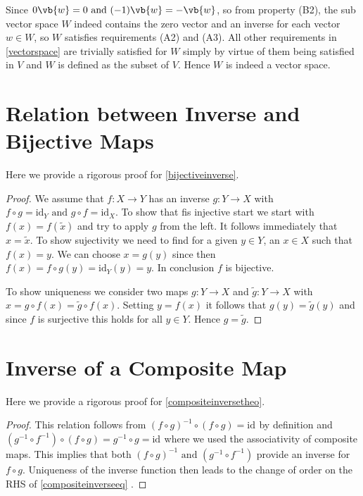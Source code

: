 \documentclass[a4paper,12pt]{report}
\begin{document}
\begin{appendices}
Since \(0\vb{w} =0 \text { and } (-1)\vb{w} =-\vb{w} \), so from property (B2), the sub vector space \(W\) indeed contains the zero vector and an inverse for each vector \(w \in  W\), so \(W\) satisfies requirements (A2) and (A3). All other requirements in \cref{vectorspace} are trivially satisfied for \(W\) simply by virtue of them being satisfied in \(V\) and \(W\) is defined as the subset of \(V\). Hence \(W\) is indeed a vector space.    

\section{Relation between Inverse and Bijective Maps} \label{bijectiveinverseapp} 

Here we provide a rigorous proof for \cref{bijectiveinverse}.

\begin{proof}
    We assume that \(f:X \rightarrow Y\) has an inverse \(g:Y \rightarrow X\) with \(f \circ g = \mathrm{id}_{Y} \text { and } g \circ f = \mathrm{id}_{X}  \). To show that fis injective start we start with \(f(x) = f(\tilde{x} )\) and try to apply \(g\) from the left. It follows immediately that \(x=\tilde{x} \). To show sujectivity we need to find for a given \(y \in  Y\), an \(x \in  X\) such that \(f(x) = y\). We can choose \(x = g(y)\) since then \(f(x) = f \circ g(y) = \mathrm{id}_{Y}(y)  = y \). In conclusion \(f\) is bijective.
    
    To show uniqueness we consider two maps \(g:Y \rightarrow X\) and \(\tilde{g} : Y \rightarrow X\) with \(x= g \circ f(x) = \tilde{g} \circ f(x)\). Setting \(y = f(x)\) it follows that \(g(y) = \tilde{g} (y)\) and since \(f\) is surjective this holds for all \(y \in  Y\). Hence \(g=\tilde{g} \).       
\end{proof}

\section{Inverse of a Composite Map} \label{compositeinverseapp} 

Here we provide a rigorous proof for \cref{compositeinversetheo}.

\begin{proof}
    This relation follows from \((f \circ g)^{-1} \circ (f \circ g) = \mathrm{id}_{}  \) by definition and \((g^{-1} \circ f^{-1} )\circ (f \circ g)= g^{-1} \circ g = \mathrm{id}_{} \) where we used the associativity of composite maps. This implies that both \((f \circ  g)^{-1} \text { and } (g^{-1} \circ f^{-1} )\) provide an inverse for \(f \circ  g\). Uniqueness of the inverse function then leads to the change of order on the RHS of \cref{compositeinverseeq} .
\end{proof}


\end{appendices}
\end{document}
